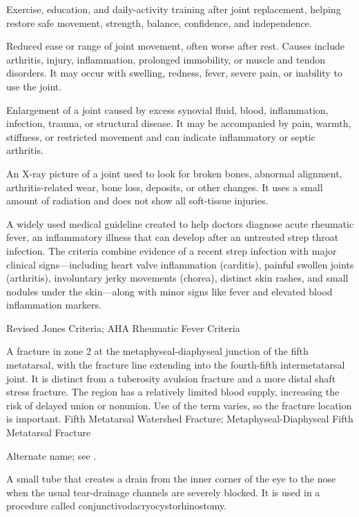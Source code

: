  Exercise, education, and daily-activity training after joint replacement, helping restore safe movement, strength, balance, confidence, and independence.

 Reduced ease or range of joint movement, often worse after rest. Causes include arthritis, injury, inflammation, prolonged immobility, or muscle and tendon disorders. It may occur with swelling, redness, fever, severe pain, or inability to use the joint.

 Enlargement of a joint caused by excess synovial fluid, blood, inflammation, infection,
trauma, or structural disease. It may be accompanied by pain, warmth, stiffness, or
restricted movement and can indicate inflammatory or septic arthritis.

 An X-ray picture of a joint used to look for broken bones, abnormal alignment, arthritis-related wear, bone loss, deposits, or other changes. It uses a small amount of radiation and does not show all soft-tissue injuries.

 A widely used medical guideline created to help doctors diagnose acute rheumatic fever, an inflammatory illness that can develop after an untreated strep throat infection. The criteria combine evidence of a recent strep infection with major clinical signs---including heart valve inflammation (carditis), painful swollen joints (arthritis), involuntary jerky movements (chorea), distinct skin rashes, and small nodules under the skin---along with minor signs like fever and elevated blood inflammation markers.

\synonyms
Revised Jones Criteria; AHA Rheumatic Fever Criteria

 A fracture in zone 2 at the metaphyseal-diaphyseal junction of the
fifth metatarsal, with the fracture line extending into the fourth-fifth intermetatarsal joint.
It is distinct from a tuberosity avulsion fracture and a more distal shaft stress fracture.
The region has a relatively limited blood supply, increasing the risk of delayed union or
nonunion. Use of the term varies, so the fracture location is important.
\synonyms
Fifth Metatarsal Watershed Fracture; Metaphyseal-Diaphyseal Fifth Metatarsal Fracture

 Alternate name; see .

 A small tube that creates a drain from the inner corner of the eye to the nose when the usual tear-drainage channels are severely blocked. It is used in a procedure called conjunctivodacryocystorhinostomy.


